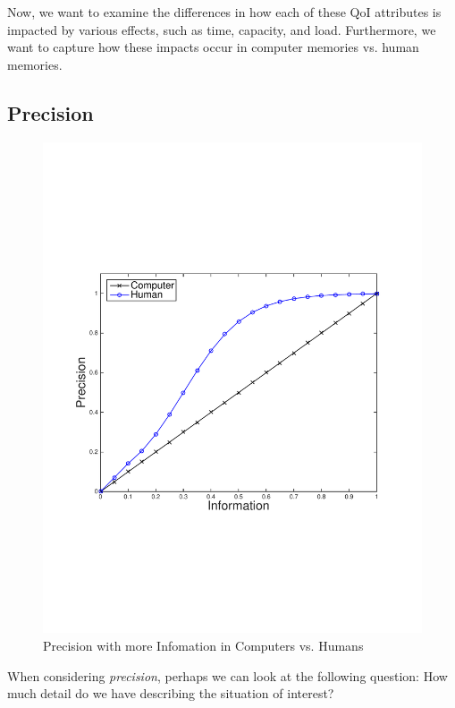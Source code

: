 Now, we want to examine the differences in how each of these QoI attributes is impacted by various effects, such as time, capacity, and load.  Furthermore, we want to capture how these impacts occur in computer memories vs. human memories.

\subsection{Precision}

\begin{figure}
\begin{centering}
    \includegraphics[clip=true, trim = 15mm 65mm 25mm 70mm, scale=0.40]{figures/example_qoi_trends/prec_vs_info_hvc_1.pdf}
    \caption{Precision with more Infomation in Computers vs. Humans }
    \label{fig:prec_vs_info_hvc}
\end{centering}
\end{figure}

When considering \emph{precision}, perhaps we can look at the following question:  How much detail do we have describing the situation of interest? 

